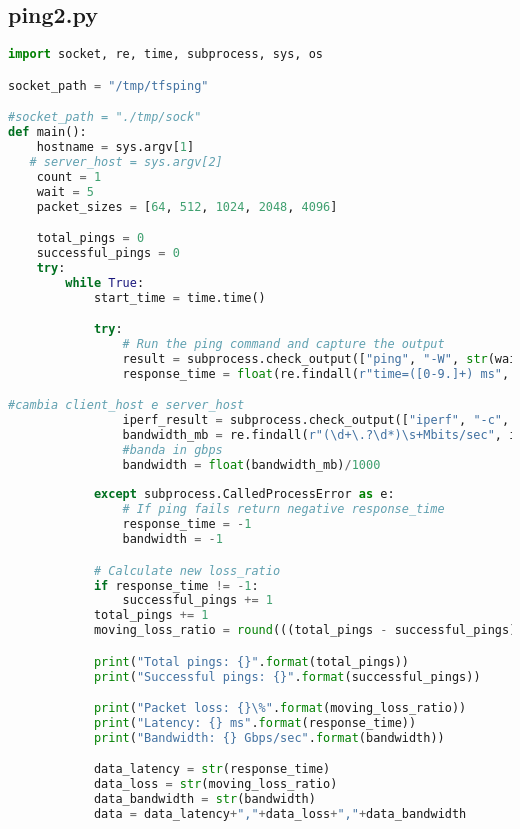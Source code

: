 \subsection{ping2.py}
\begin{lstlisting}[language=Python]
import socket, re, time, subprocess, sys, os

socket_path = "/tmp/tfsping"

#socket_path = "./tmp/sock"
def main():
    hostname = sys.argv[1]
   # server_host = sys.argv[2]
    count = 1
    wait = 5
    packet_sizes = [64, 512, 1024, 2048, 4096]

    total_pings = 0
    successful_pings = 0
    try:
        while True:
            start_time = time.time()

            try:
                # Run the ping command and capture the output
                result = subprocess.check_output(["ping", "-W", str(wait), "-c", str(count), hostname], universal_newlines=True)
                response_time = float(re.findall(r"time=([0-9.]+) ms", result)[0])

#cambia client_host e server_host
                iperf_result = subprocess.check_output(["iperf", "-c", hostname], universal_newlines=True)
                bandwidth_mb = re.findall(r"(\d+\.?\d*)\s+Mbits/sec", iperf_result)[-1]
                #banda in gbps
                bandwidth = float(bandwidth_mb)/1000
           
            except subprocess.CalledProcessError as e:
                # If ping fails return negative response_time
                response_time = -1
                bandwidth = -1

            # Calculate new loss_ratio
            if response_time != -1:
                successful_pings += 1
            total_pings += 1
            moving_loss_ratio = round(((total_pings - successful_pings) / float(total_pings) * 100), 2)

            print("Total pings: {}".format(total_pings))
            print("Successful pings: {}".format(successful_pings))

            print("Packet loss: {}\%".format(moving_loss_ratio))
            print("Latency: {} ms".format(response_time))
            print("Bandwidth: {} Gbps/sec".format(bandwidth))

            data_latency = str(response_time)
            data_loss = str(moving_loss_ratio)
            data_bandwidth = str(bandwidth)
            data = data_latency+","+data_loss+","+data_bandwidth


\end{lstlisting}
